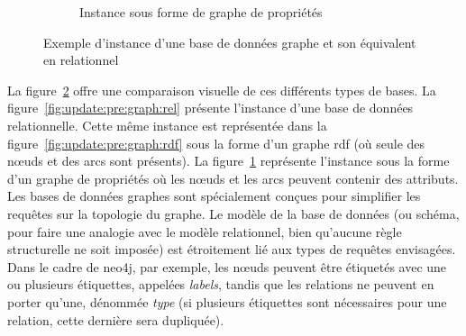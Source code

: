\begin{figure}[p]
\begin{minipage}[][\textheight][c]{\textwidth}
\begin{subfigure}[t]{\linewidth}
\begin{adjustbox}{width=\linewidth, max height=.25\textheight}
            \end{adjustbox}
            \caption{Instance sous forme de graphe de propriétés}
            \label{fig:update:pre:graph:prop}
        \end{subfigure}
        \caption{Exemple d'instance d'une base de données graphe et son équivalent en relationnel}
        \label{fig:update:pre:graph}
    \end{minipage}
\end{figure}

La figure~\ref{fig:update:pre:graph} offre une comparaison visuelle de ces différents types de bases.
La figure~\ref{fig:update:pre:graph:rel} présente l'instance d'une base de données relationnelle.
Cette même instance est représentée dans la figure~\ref{fig:update:pre:graph:rdf} sous la forme d'un graphe \gls{rdf} (où seule des nœuds et des arcs sont présents).
La figure~\ref{fig:update:pre:graph:prop} représente l'instance sous la forme d'un graphe de propriétés où les nœuds et les arcs peuvent contenir des attributs.
Les bases de données graphes sont spécialement conçues pour simplifier les requêtes sur la topologie du graphe.
Le modèle de la base de données (ou schéma, pour faire une analogie avec le modèle relationnel, bien qu'aucune règle structurelle ne soit imposée) est étroitement lié aux types de requêtes envisagées.
Dans le cadre de \gls{neo4j}, par exemple, les nœuds peuvent être étiquetés avec une ou plusieurs étiquettes, appelées \emph{labels}, tandis que les relations ne peuvent en porter qu'une, dénommée \emph{type} (si plusieurs étiquettes sont nécessaires pour une relation, cette dernière sera dupliquée).

